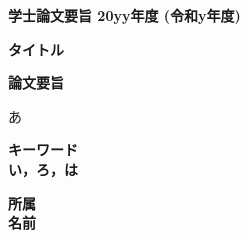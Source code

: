 \begin{center}
\textbf{\Large 学士論文要旨 20yy年度 (令和y年度)}

\vspace{6.18mm}

\textbf{\large タイトル} 

\end{center}

\vspace{10mm}

\begin{flushleft}
\textbf{論文要旨}\\
\end{flushleft}
あ

\begin{flushleft}
\textbf{キーワード}\\
\textbf{い，ろ，は}


\end{flushleft}

\begin{flushright}
\textbf{所属}\\
\textbf{名前}
\end{flushright}
\newpage

